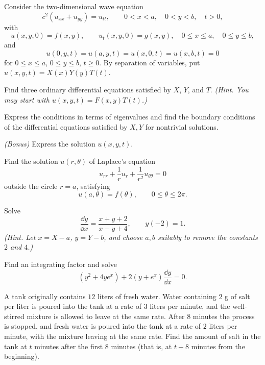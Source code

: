 \documentclass[11pt,oneside]{article}
\begin{document}
\begin{problem}
Consider the two-dimensional wave equation
\[
c^2(u_{xx}+u_{yy})=u_{tt},\qquad 0<x<a,\quad 0<y<b,\quad t>0,
\]
with
\[
u(x,y,0)=f(x,y),\qquad u_t(x,y,0)=g(x,y),
\quad 0\le x\le a,\quad 0\le y\le b,
\]
and
\[
u(0,y,t)=u(a,y,t)=u(x,0,t)=u(x,b,t)=0
\]
for $0\le x\le a$, $0\le y\le b$, $t\ge0$. By separation of variables, put $u(x,y,t)=X(x)Y(y)T(t)$.
\begin{problemsubparts}
\item Find three ordinary differential equations satisfied by $X$, $Y$, and $T$. \textit{(Hint. You may start with $u(x,y,t)=F(x,y)T(t)$.)}
\item Express the conditions in terms of eigenvalues and find the boundary conditions of the differential equations satisfied by $X,Y$ for nontrivial solutions.
\item \textit{(Bonus)} Express the solution $u(x,y,t)$.
\end{problemsubparts}
\end{problem}

\begin{problem}
Find the solution $u(r,\theta)$ of Laplace's equation
\[
u_{rr}+\frac1r u_r+\frac1{r^2}u_{\theta\theta}=0
\]
outside the circle $r=a$, satisfying
\[
u(a,\theta)=f(\theta),\qquad 0\le\theta\le2\pi.
\]
\end{problem}

\begin{problem}
Solve
\[
\frac{\dd y}{\dd x}=\frac{x+y+2}{x-y+4},\qquad y(-2)=1.
\]
\textit{(Hint. Let $x=X-a$, $y=Y-b$, and choose $a,b$ suitably to remove the constants $2$ and $4$.)}
\end{problem}

\begin{problem}
Find an integrating factor and solve
\[
(y^2+4ye^x)+2(y+e^x)\frac{\dd y}{\dd x}=0.
\]
\end{problem}

\begin{problem}
A tank originally contains $12$ liters of fresh water. Water containing $2$ g of salt per liter is poured into the tank at a rate of $3$ liters per minute, and the well-stirred mixture is allowed to leave at the same rate. After $8$ minutes the process is stopped, and fresh water is poured into the tank at a rate of $2$ liters per minute, with the mixture leaving at the same rate. Find the amount of salt in the tank at $t$ minutes after the first $8$ minutes (that is, at $t+8$ minutes from the beginning).
\end{problem}
\end{document}

